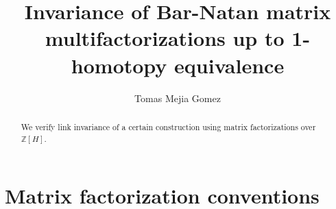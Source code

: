 \documentclass{article}
\title{Invariance of Bar-Natan matrix multifactorizations up to 1-homotopy equivalence}
\author{Tomas Mejia Gomez}
\newcommand{\Z}{\mathbb{Z}}
\newcommand{\DD}{\mathcal{D}}
\newcommand{\gr}{\mathsf{gr}}
\newcommand{\KK}{\mathbf{K}}
\newcommand{\G}{\mathsf{G}}
\theoremstyle{plain} %
\theoremstyle{definition} %
\theoremstyle{remark} %
\begin{document}
\maketitle

\begin{abstract}
We verify link invariance of a certain construction using matrix factorizations over $\Z[H]$.

\end{abstract}



\section{Matrix factorization conventions}

%
%
%
%
\end{document}
